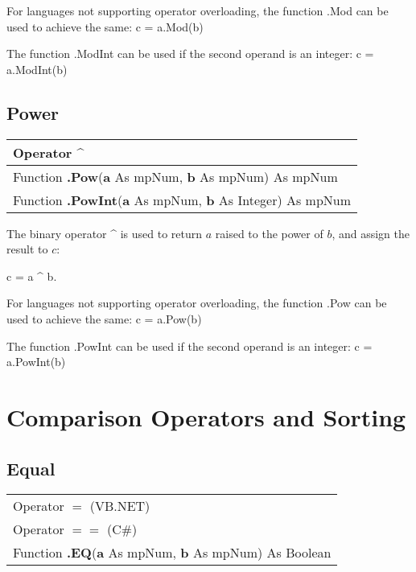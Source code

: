 For languages not supporting operator overloading, the function \textsf{.Mod} can be used to achieve the same: \textsf{c = a.Mod(b)}

The function \textsf{.ModInt}  can be used if the second operand is an integer: \textsf{c = a.ModInt(b)}





\subsection{Power}
\begin{tabular}{p{481pt}}
	\toprule
	\textsf{Operator \textbf{\^}}\index{Multiprecision Functions!\^} \\
	\midrule
	\textsf{Function \textbf{.Pow}(\textbf{a} As mpNum, \textbf{b} As mpNum) As mpNum}\index{Multiprecision Functions!.Pow} \\
	\textsf{Function \textbf{.PowInt}(\textbf{a} As mpNum, \textbf{b} As Integer) As mpNum}\index{Multiprecision Functions!.PowInt} \\
	\bottomrule
\end{tabular}

\vspace{0.3cm}
The binary operator \textsf{\^} is used to return $a$ raised to the power of $b$, and assign the result to $c$:

\textsf{c = a} \textsf{\^} \textsf{b}.

For languages not supporting operator overloading, the function \textsf{.Pow} can be used to achieve the same: \textsf{c = a.Pow(b)}

The function \textsf{.PowInt}  can be used if the second operand is an integer: \textsf{c = a.PowInt(b)}









\section{Comparison Operators and Sorting}
\label{FpComparisonOperators}




\subsection{Equal}
\begin{tabular}{p{481pt}}
	\toprule
	\textsf{Operator $\boldsymbol{=}$} (VB.NET)\index{Multiprecision Functions!=} \\
	\textsf{Operator $\boldsymbol{==}$} (C\#)\index{Multiprecision Functions!=} \\
	\midrule
	\textsf{Function \textbf{.EQ}(\textbf{a} As mpNum, \textbf{b} As mpNum) As Boolean}\index{Multiprecision Functions!.EQ} \\
	\bottomrule
\end{tabular}

